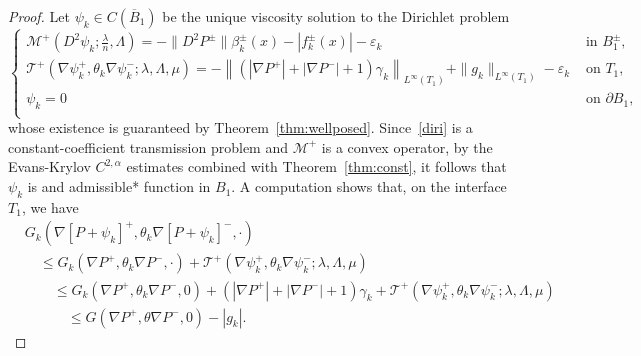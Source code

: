 \documentclass[letter,11pt]{amsart}
\newcommand{\vep}{\varepsilon}
\newcommand{\mcal}{\mathcal{M}}
\newcommand{\tcal}{\mathcal{T}}
\theoremstyle{definition}
\numberwithin{equation}{section}
\begin{document}
\begin{proof}
Let $\psi_k \in C(\overline{B}_1)$ be the unique viscosity solution to the Dirichlet problem
\begin{equation}
\label{diri}
\begin{cases}
\mcal^{+}(D^2 \psi_k; \frac{\lambda}{n}, \Lambda) = 
- \|D^2 P^{\pm}\| \beta^{\pm}_k(x) - |f_k^{\pm}(x)| - \vep_k
& \text{ in } B_1^{\pm},\\
\tcal^{+}(\nabla \psi_k^{+}, \theta_k \nabla \psi_k^{-}; \lambda,\Lambda,\mu) = 
- \left\| \left(|\nabla P^{+}|+ |\nabla P^{-}|+1\right) \gamma_k \right\|_{L^{\infty}(T_1)}+ \|g_k\|_{L^{\infty}(T_1)} - \vep_k
& \text{ on } T_1,\\
\psi_k = 0 & \text{ on } \partial B_1,\\
\end{cases}
\end{equation}
whose existence is guaranteed by Theorem~\ref{thm:wellposed}.
Since~\eqref{diri} is a constant-coefficient transmission problem and $\mcal^{+}$ is a convex operator, by the Evans-Krylov $C^{2,\alpha}$ estimates combined with Theorem~\ref{thm:const}, it follows that $\psi_k$ is and admissible* function in $B_1$.
A computation shows that, on the interface $T_1$, we have
\begin{equation}
\label{imp1}
\begin{split}
&G_k(\nabla[P+\psi_k]^{+}, \theta_k \nabla[P+\psi_k]^{-}, \cdot)\\ 
& \quad \leq G_k(\nabla P^{+}, \theta_k \nabla P^{-}, \cdot) 
+ \tcal^{+} (\nabla \psi_k^{+}, \theta_k \nabla \psi_k^{-}; \lambda,\Lambda,\mu)\\
& \qquad \leq G_k(\nabla P^{+}, \theta_k \nabla P^{-}, 0) + \left(|\nabla P^{+}| + |\nabla P^{-}|+1\right)\gamma_k 
+ \tcal^{+} (\nabla \psi_k^{+}, \theta_k \nabla \psi_k^{-}; \lambda,\Lambda,\mu)\\
& \qquad \quad \leq G(\nabla P^{+}, \theta \nabla P^{-}, 0) - |g_k|.
\end{split}
\end{equation}


\end{proof}
\end{document}
